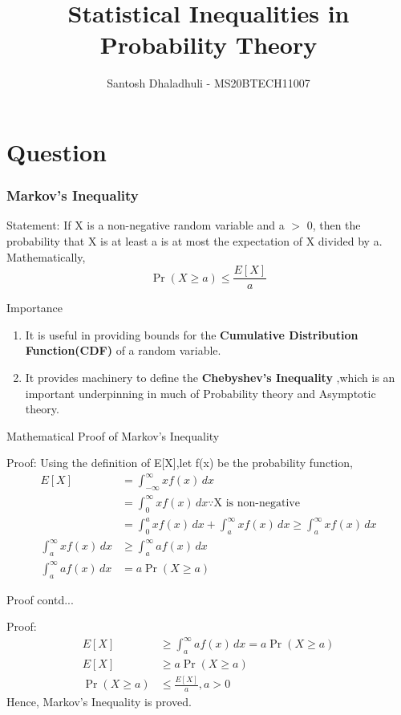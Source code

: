 \documentclass{beamer}
\title{Statistical Inequalities in Probability Theory}
\author{Santosh Dhaladhuli - MS20BTECH11007}
\providecommand{\pr}[1]{\ensuremath{\Pr\left(#1\right)}}
\begin{document}
\begin{frame}
\titlepage
\end{frame}
\section{Question}
\begin{frame}
\frametitle{Markov's Inequality}
\begin{block}{Statement:}
If X is a non-negative random variable and a $>$ 0, then the probability that X is at least a is at most the expectation of X divided by a. \\
Mathematically,
\begin{equation}
    \pr{X \ge a} \le \frac{E[X]}{a}
\end{equation}
\end{block}
\end{frame}
\begin{frame}
\begin{block}{Importance}
\begin{enumerate}
    \item It is useful in providing bounds for the\textbf{ Cumulative Distribution Function(CDF)} of a random variable. \\
    \item It provides machinery to define the \textbf{Chebyshev's Inequality },which is an important underpinning in much of Probability theory and Asymptotic theory.
\end{enumerate}
\end{block}
\end{frame}
\begin{frame}{Mathematical Proof of Markov's Inequality}
\begin{block}{Proof:}
Using the definition of E[X],let f(x) be the probability function,
\begin{align}
    E[X] &= \int_{-\infty}^{\infty} xf(x) \,dx \\
    &= \int_{0}^{\infty} xf(x) \,dx \because \text{X is non-negative} \\
    &= \int_{0}^{a} xf(x) \,dx + \int_{a}^{\infty} xf(x) \,dx \ge \int_{a}^{\infty} xf(x) \,dx \\
    \int_{a}^{\infty} xf(x) \,dx &\ge \int_{a}^{\infty} af(x) \,dx \\ 
    \int_{a}^{\infty} af(x) \,dx &= a\pr{X\ge a}
\end{align}
\end{block}
\end{frame}
\begin{frame}{Proof contd...}
   \begin{block}{Proof:} 
   \begin{align}
     E[X] &\ge \int_{a}^{\infty} af(x) \,dx = a\pr{X\ge a}\\
     E[X] &\ge a\pr{X\ge a} \\
     \label{markov}
     \pr{X\ge a} &\le \frac{E[X]}{a} , a > 0
    \end{align}
   \centering Hence, Markov's Inequality is proved.
\end{block}
\end{frame}
\end{document}
